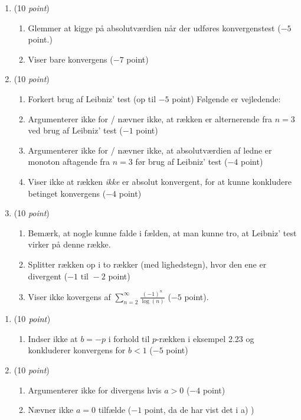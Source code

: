 \documentclass{article}
\begin{document}
\begin{opg}\hfill
	\begin{enumerate}
		\item (10 \emph{point})\begin{enumerate}[label=(\roman*)]
			\item Glemmer at kigge på absolutværdien når der udføres konvergenstest ($ -5 $ point.)
			\item Viser bare konvergens ($ -7 $ point)
		\end{enumerate}
		\item (10 \emph{point}) \begin{enumerate}[label=(\roman*)]
			\item Forkert brug af Leibniz' test (op til $ -5 $ point) Følgende er vejledende:
			\item Argumenterer ikke for / nævner ikke, at rækken er alternerende fra $ n=3 $ ved brug af Leibniz' test ($ -1 $ point)
			\item Argumenterer ikke for / nævner ikke, at absolutværdien af ledne er monoton aftagende fra $ n=3 $ før brug af Leibniz' test ($ -4 $ point)
			\item Viser ikke at rækken \emph{ikke} er absolut konvergent, for at kunne konkludere betinget konvergens ($ -4 $ point)
		\end{enumerate}
		\item (10 \emph{point})\begin{enumerate}[label=(\roman*)]
			\item Bemærk, at nogle kunne falde i fælden, at man kunne tro, at Leibniz' test virker på denne række.
			\item Splitter rækken op i to rækker (med lighedstegn), hvor den ene er divergent ($ -1\text{ til }-2 $ point)
			\item Viser ikke kovergens af $ \sum_{n=2}^{\infty}\frac{(-1)^n}{\log(n)} $ ($ -5 $ point).
		\end{enumerate}
	\end{enumerate}	
\end{opg}
\begin{opg}\hfill
	\begin{enumerate}
		\item (10 $ \emph{point} $)
		\begin{enumerate}[label=(\roman*)]
			\item Indser ikke at $ b=-p $ i forhold til $ p $-rækken i eksempel 2.23 og konkluderer konvergens for $ b<1 $ ($ -5 $ point)
		\end{enumerate}
		\item (10 \emph{point}) 
		\begin{enumerate}[label=(\roman*)]
			\item Argumenterer ikke for divergens hvis $ a>0 $ ($ -4 $ point)
			\item Nævner ikke $ a=0 $ tilfælde ($ -1 $ point, da de har vist det i a) )
		\end{enumerate}

	\end{enumerate}
\end{opg}
\end{document}
